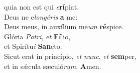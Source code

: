\evenverse quia non est qui \textit{e}\textbf{rí}piat.\\
\oddverse Deus ne e\textit{lon}\textit{gé}\textit{ris} \textbf{a} me:~\*\\
\oddverse Deus meus, in auxílium me\textit{um} \textbf{ré}spice.\\
\evenverse Glória \textit{Pa}\textit{tri}, \textit{et} \textbf{Fí}lio,~\*\\
\evenverse et Spirítu\textit{i} \textbf{San}cto.\\
\oddverse Sicut erat in princípio, \textit{et} \textit{nunc}, \textit{et} \textbf{sem}per,~\*\\
\oddverse et in sǽcula sæculó\textit{rum}. \textbf{A}men.\\
